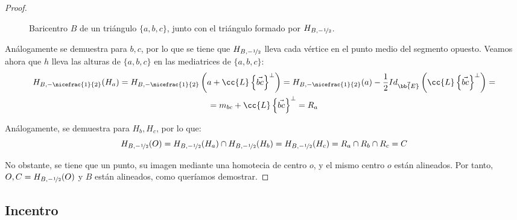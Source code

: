 \begin{proof}
\begin{figure}[H]
        \caption{\centering Baricentro $B$ de un triángulo $\{a,b,c\}$, junto con el triángulo formado por $H_{B,-\nicefrac{1}{2}}$.}
    \end{figure}
    Análogamente se demuestra para $b,c$, por lo que se tiene que $H_{B,-\nicefrac{1}{2}}$ lleva cada vértice en el punto medio del segmento opuesto. Veamos ahora que $h$ lleva las alturas de $\{a,b,c\}$ en las mediatrices de $\{a,b,c\}$:
    \begin{multline*}
        H_{B,-\nicefrac{1}{2}}(H_a) = H_{B,-\nicefrac{1}{2}}\left(a + \cc{L}\left\{\vec{bc}\right\}^\perp\right)
        = H_{B,-\nicefrac{1}{2}}(a) -\frac{1}{2}Id_{\vec{\bb{E}}}\left(\cc{L}\left\{\vec{bc}\right\}^\perp\right) =\\= m_{bc} + \cc{L}\left\{\vec{bc}\right\}^\perp= R_a
    \end{multline*}
    
    Análogamente, se demuestra para $H_b, H_c$, por lo que:
    \begin{equation*}
        H_{B,-\nicefrac{1}{2}}(O) = H_{B,-\nicefrac{1}{2}}(H_a) \cap H_{B,-\nicefrac{1}{2}}(H_b) = H_{B,-\nicefrac{1}{2}}(H_c) = R_a\cap R_b \cap R_c = C
    \end{equation*}
    
    No obstante, se tiene que un punto, su imagen mediante una homotecia de centro $o$, y el mismo centro $o$ están alineados. Por tanto, $O, C=H_{B,-\nicefrac{1}{2}}(O)$ y $B$ están alineados, como queríamos demostrar.
\end{proof}

\subsection{Incentro}

